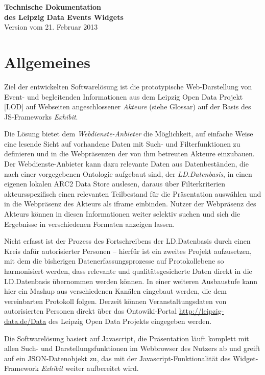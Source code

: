 \documentclass[11pt,a4paper]{article}
\begin{document}
\begin{center}
  \textbf{\Large Technische Dokumentation\\[.3em] des Leipzig Data Events
    Widgets}\\[1em] Version vom 21. Februar 2013
\end{center}

\section{Allgemeines}
Ziel der entwickelten Softwarelösung ist die prototypische Web-Darstellung von
Event- und begleitenden Informationen aus dem Leipzig Open Data Projekt [LOD]
auf Webseiten angeschlossener \emph{Akteure} (siehe Glossar) auf der Basis des
JS-Frameworks \emph{Exhibit}.

Die Lösung bietet dem \emph{Webdienste-Anbieter} die Möglichkeit, auf einfache
Weise eine lesende Sicht auf vorhandene Daten mit Such- und Filterfunktionen
zu definieren und in die Webpräsenzen der von ihm betreuten Akteure
einzubauen.  Der Webdienste-Anbieter kann dazu relevante Daten aus
Datenbeständen, die nach einer vorgegebenen Ontologie aufgebaut sind, der
\emph{LD.Datenbasis}, in einen eigenen lokalen ARC2 Data Store auslesen,
daraus über Filterkriterien akteursspezifisch einen relevanten Teilbestand für
die Präsentation auswählen und in die Webpräsenz des Akteurs als iframe
einbinden.  Nutzer der Webpräsenz des Akteurs können in diesen Informationen
weiter selektiv suchen und sich die Ergebnisse in verschiedenen Formaten
anzeigen lassen.

Nicht erfasst ist der Prozess des Fortschreibens der LD.Datenbasis durch einen
Kreis dafür autorisierter Personen -- hierfür ist ein zweites Projekt
aufzusetzen, mit dem die bisherigen Datenerfassungsprozesse auf Protokollebene
so harmonisiert werden, dass relevante und qualitätsgesicherte Daten direkt in
die LD.Datenbasis übernommen werden können. In einer weiteren Ausbaustufe kann
hier ein Mashup aus verschiedenen Kanälen eingebaut werden, die dem
vereinbarten Protokoll folgen.  Derzeit können Veranstaltungsdaten von
autorisierten Personen direkt über das Ontowiki-Portal
\url{http://leipzig-data.de/Data} des Leipzig Open Data Projekts eingegeben
werden.

Die Softwarelösung basiert auf Javascript, die Präsentation läuft komplett mit
allen Such- und Darstellungsfunktionen im Webbrowser des Nutzers ab und greift
auf ein JSON-Datenobjekt zu, das mit der Javascript-Funktionalität des
Widget-Framework \emph{Exhibit} weiter aufbereitet wird.
\end{document}
